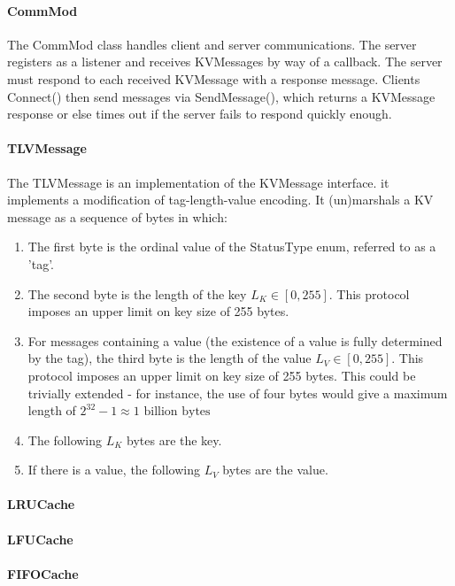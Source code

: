 \documentclass[12pt]{article}
\begin{document}
\begin{multicols}{2}
\begin{enumerate}
\paragraph{CommMod} The CommMod class handles client and server communications. The server registers as a listener and receives KVMessages by way of a callback. The server must respond to each received KVMessage with a response message. Clients Connect() then send messages via SendMessage(), which returns a KVMessage response or else times out if the server fails to respond quickly enough.

\paragraph{TLVMessage} The TLVMessage is an implementation of the KVMessage interface. it implements a modification of tag-length-value encoding. It (un)marshals a KV message as a sequence of bytes in which:

\begin{enumerate}
\item The first byte is the ordinal value of the StatusType enum, referred to as a 'tag'.
\item The second byte is the length of the key $L_K \in [0, 255]$. This protocol imposes an upper limit on key size of 255 bytes.
\item For messages containing a value (the existence of a value is fully determined by the tag), the third byte is the length of the value $L_V \in [0, 255]$. This protocol imposes an upper limit on key size of 255 bytes. This could be trivially extended - for instance, the use of four bytes would give a maximum length of $2^32-1\approx 1 \text{ billion bytes}$
\item The following $L_K$ bytes are the key.
\item If there is a value, the following $L_V$ bytes are the value.
\end{enumerate}

\paragraph{LRUCache}

\paragraph{LFUCache}

\paragraph{FIFOCache}


\end{enumerate}
\end{multicols}
\end{document}
